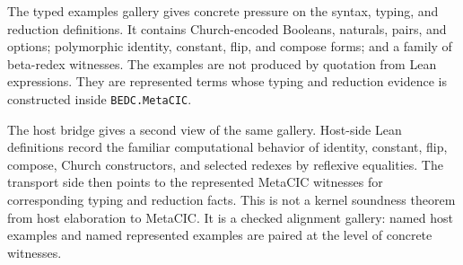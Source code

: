 The typed examples gallery gives concrete pressure on the syntax, typing, and
reduction definitions.  It contains Church-encoded Booleans, naturals, pairs,
and options; polymorphic identity, constant, flip, and compose forms; and a
family of beta-redex witnesses.  The examples are not produced by quotation
from Lean expressions.  They are represented terms whose typing and reduction
evidence is constructed inside \texttt{BEDC.MetaCIC}.


The host bridge gives a second view of the same gallery.  Host-side Lean
definitions record the familiar computational behavior of identity, constant,
flip, compose, Church constructors, and selected redexes by reflexive
equalities.  The transport side then points to the represented MetaCIC
witnesses for corresponding typing and reduction facts.  This is not a kernel
soundness theorem from host elaboration to MetaCIC.  It is a checked alignment
gallery: named host examples and named represented examples are paired at the
level of concrete witnesses.

